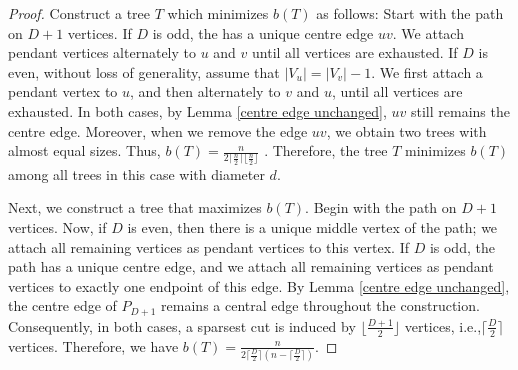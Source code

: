 \documentclass[12pt]{article}
\begin{document}
\begin{proof}
  Construct a tree $T$ which minimizes $b(T)$ as follows: Start with the path on $D+1$ vertices. If $D$ is odd, the has a unique centre edge $uv$. We attach pendant vertices alternately to 
 $u$ and $v$  until all vertices are exhausted. If $D$ is even, without loss of generality, assume that $\vert V_u \vert=\vert V_v \vert-1$. We first attach a pendant vertex to $u$, and then alternately to $v$ and $u$, until all vertices are exhausted. In both cases, by Lemma \ref{centre edge unchanged}, $uv$ still remains the centre edge. Moreover, when we remove the edge $uv$, we obtain two trees with almost equal sizes. 
   Thus, $b(T)=\frac{n}{2\lceil \frac{n}{2}\rceil \lfloor \frac{n}{2}\rfloor}$ . Therefore, the tree $T$ minimizes $b(T)$ among all trees in this case with diameter $d$.



Next, we construct a tree that maximizes $b(T)$. Begin with the path on ${D+1}$ vertices. Now, if $D$ is even, then there is a unique middle vertex of the path; we attach all remaining vertices as pendant vertices to this vertex. If $D$ is odd, the path has a unique centre edge, and we attach all remaining vertices as pendant vertices to exactly one endpoint of this edge. By Lemma \ref{centre edge unchanged}, the centre edge of $P_{D+1}$ remains a central edge throughout the construction. Consequently, in both cases, a sparsest cut is induced by $\lfloor \frac{D+1}{2} \rfloor$ vertices, i.e.,$\lceil \frac{D}{2} \rceil$ vertices. Therefore, we have $b(T)=\frac{n}{2\lceil \frac{D}{2} \rceil (n-\lceil \frac{D}{2} \rceil)}$.



\end{proof}
\end{document}
